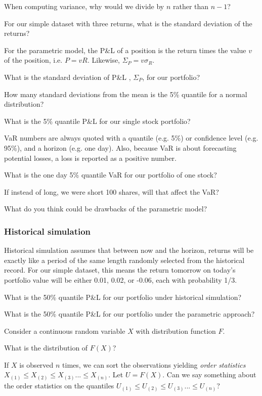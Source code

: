 \documentclass{report}
\numberwithin{problem}{chapter} %
\let\oldroblem\problem
\renewcommand{\problem}{ \oldroblem  \normalfont}
\newcommand{\vs}{\vspace}
\newcommand{\pnl}{P\&L }
\begin{document}
\problem When computing variance, why would we divide by $n$ rather than $n-1$?

\problem For our simple dataset with three returns, what is the standard deviation of the returns?

\vs{.5cm}

For the parametric model, the \pnl of a \gls{position} is the return times the value $v$ of the position, i.e. $P = v R$. Likewise, $\Sigma_P = v \sigma_R$.

\problem What is the standard deviation of \pnl, $\Sigma_P$, for our portfolio?

\problem How many standard deviations from the mean is the 5\% quantile for a normal distribution?

\problem What is the 5\% quantile \pnl for our single stock portfolio?

\gls{VaR} numbers are always quoted with a quantile (e.g. 5\%)  or confidence level (e.g. 95\%), and a horizon (e.g. one day). Also, because VaR is about forecasting potential losses, a loss is reported as a positive number. 

\problem What is the one day 5\% quantile VaR for our portfolio of one stock?

\problem If instead of long, we were short 100 shares, will that affect the VaR?

\problem What do you think could be drawbacks of the parametric model?

\pagebreak 
\subsubsection{Historical simulation}
Historical simulation assumes that between now and the horizon, returns will be exactly like a period of the same length randomly selected from the historical record. For our simple dataset, this means the return tomorrow on today's portfolio value will be either 0.01, 0.02, or -0.06, each with probability 1/3.

\problem What is the 50\% quantile \pnl for our portfolio under historical simulation? 

\problem What is the 50\% quantile \pnl for our portfolio under the parametric approach?

\vs{3mm}
Consider a continuous random variable $X$ with distribution function $F$. 

\problem What is the distribution of $F(X)$? 
\vs{5mm}

If $X$ is  observed $n$ times, we can sort the observations yielding {\it order statistics} $X_{(1)} \leq X_{(2)} \leq X_{(3)} ...  \leq X_{(n)}$. Let $U=F(X)$. Can we say something about the order statistics on the quantiles $U_{(1)} \leq U_{(2)} \leq U_{(3)} ...  \leq U_{(n)}$? 
\end{document}
